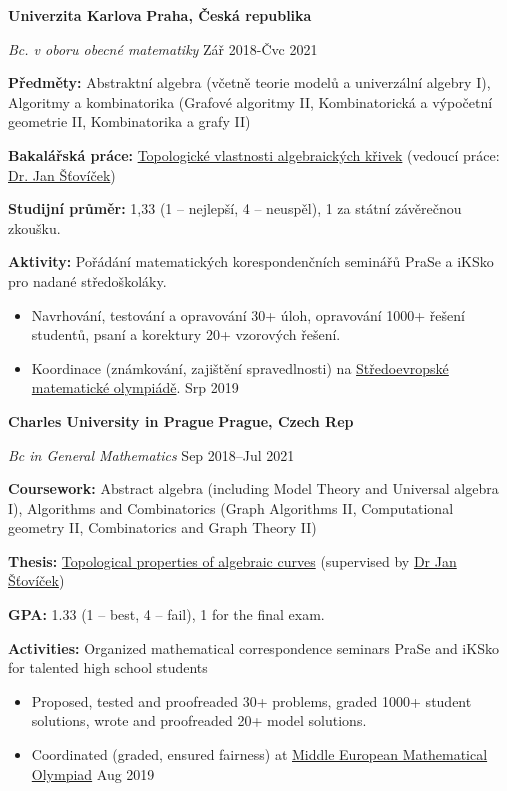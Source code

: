 \ifczech
\textbf{Univerzita Karlova} \hfill \textbf{Praha, Česká republika} \par
\textit{Bc. v oboru obecné matematiky} \hfill Zář 2018-Čvc 2021 \par
\textbf{Předměty:} Abstraktní algebra (včetně teorie modelů a univerzální algebry I), Algoritmy a kombinatorika (Grafové algoritmy II, Kombinatorická a výpočetní geometrie II, Kombinatorika a grafy II) \par
\textbf{Bakalářská práce:} \href{https://dspace.cuni.cz/handle/20.500.11956/128190}{Topologické vlastnosti algebraických křivek} (vedoucí práce: \href{https://scholar.google.com/scholar?hl=en&as_sdt=0\%2C5&q=jan+šťovíček&btnG=}{Dr. Jan Šťovíček}) \par
\textbf{Studijní průměr:} 1,33 (1 -- nejlepší, 4 -- neuspěl), 1 za státní závěrečnou zkoušku. \par
\textbf{Aktivity:} Pořádání matematických korespondenčních seminářů PraSe a iKSko pro nadané středoškoláky.
\begin{itemize}
\item Navrhování, testování a opravování 30+ úloh, opravování 1000+ řešení studentů, psaní a korektury 20+ vzorových řešení.
\item Koordinace (známkování, zajištění spravedlnosti) na \href{https://memo2019.karlin.mff.cuni.cz/#/staff}{Středoevropské matematické olympiádě}. \hfill Srp 2019
\end{itemize}

\else

\textbf{Charles University in Prague} \hfill \textbf{Prague, Czech Rep} \par
\textit{Bc in General Mathematics} \hfill Sep 2018--Jul 2021 \par
\textbf{Coursework:} Abstract algebra (including Model Theory and Universal algebra I), Algorithms and Combinatorics (Graph Algorithms II, Computational geometry II, Combinatorics and Graph Theory II) \par
\textbf{Thesis:} \href{https://dspace.cuni.cz/handle/20.500.11956/128190}{Topological properties of algebraic curves} (supervised by \href{https://scholar.google.com/scholar?hl=en&as_sdt=0\%2C5&q=jan+šťovíček&btnG=}{Dr Jan Šťovíček}) \par
\textbf{GPA:} 1.33 (1 -- best, 4 -- fail), 1 for the final exam. \par
\textbf{Activities:} Organized mathematical correspondence seminars PraSe and iKSko for talented high school students
\begin{itemize}
    \item Proposed, tested and proofreaded 30+ problems, graded 1000+ student solutions, wrote and proofreaded 20+ model solutions.
    \item Coordinated (graded, ensured fairness) at \href{https://memo2019.karlin.mff.cuni.cz/#/staff}{Middle European Mathematical Olympiad} \hfill Aug 2019
\end{itemize}

\fi
